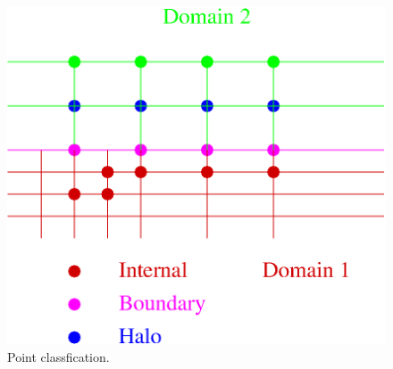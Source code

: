 \begin{figure}[h] 
\begin{center}
\ifcase\pdfoutput
\includegraphics[scale=0.65]{figures/points.eps}%
\or
{}
\fi
\end{center}
\caption{Point classfication.\label{fig:points}}
\end{figure}

